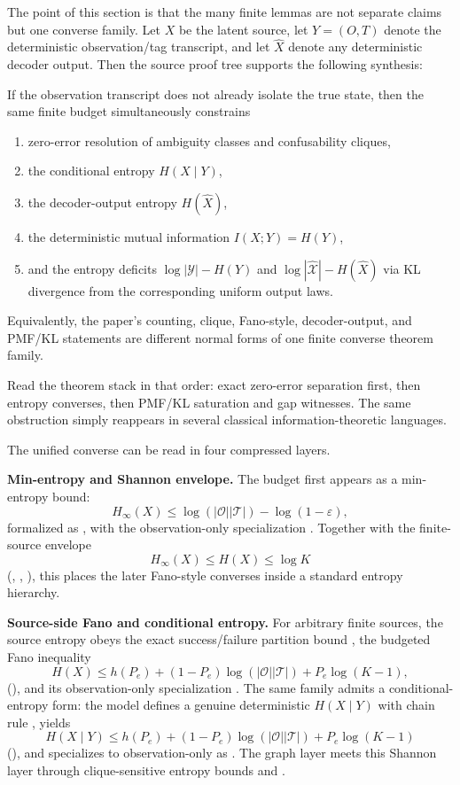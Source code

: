 The point of this section is that the many finite lemmas are not separate claims but one converse family. Let $X$ be the latent source, let $Y=(O,T)$ denote the deterministic observation/tag transcript, and let $\hat X$ denote any deterministic decoder output. Then the source proof tree supports the following synthesis:
\begin{theorem}
If the observation transcript does not already isolate the true state, then the same finite budget simultaneously constrains
\begin{enumerate}
\tightlist
\item zero-error resolution of ambiguity classes and confusability cliques,
\item the conditional entropy $H(X\mid Y)$,
\item the decoder-output entropy $H(\hat X)$,
\item the deterministic mutual information $I(X;Y)=H(Y)$,
\item and the entropy deficits $\log |\mathcal Y|-H(Y)$ and $\log |\hat{\mathcal X}|-H(\hat X)$ via KL divergence from the corresponding uniform output laws.
\end{enumerate}
Equivalently, the paper's counting, clique, Fano-style, decoder-output, and PMF/KL statements are different normal forms of one finite converse theorem family.
\end{theorem}

Read the theorem stack in that order: exact zero-error separation first, then entropy converses, then PMF/KL saturation and gap witnesses. The same obstruction simply reappears in several classical information-theoretic languages.

The unified converse can be read in four compressed layers.

\textbf{Min-entropy and Shannon envelope.} The budget first appears as a min-entropy bound:
\[
H_{\infty}(X) \le \log(|\mathcal O||\mathcal T|) - \log(1-\varepsilon),
\]
formalized as , with the observation-only specialization . Together with the finite-source envelope
\[
H_{\infty}(X) \le H(X) \le \log K
\]
(, , ), this places the later Fano-style converses inside a standard entropy hierarchy.

\textbf{Source-side Fano and conditional entropy.} For arbitrary finite sources, the source entropy obeys the exact success/failure partition bound , the budgeted Fano inequality
\[
H(X) \le h(P_e) + (1-P_e)\log(|\mathcal O||\mathcal T|) + P_e\log(K-1),
\]
(), and its observation-only specialization . The same family admits a conditional-entropy form: the model defines a genuine deterministic $H(X\mid Y)$ with chain rule , yields
\[
H(X\mid Y) \le h(P_e) + (1-P_e)\log(|\mathcal O||\mathcal T|) + P_e\log(K-1)
\]
(), and specializes to observation-only as . The graph layer meets this Shannon layer through clique-sensitive entropy bounds  and .

